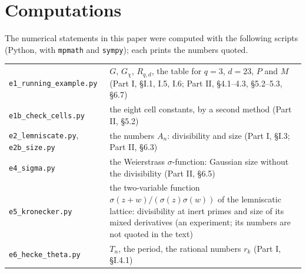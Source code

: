 \documentclass[11pt,letterpaper]{article}
\begin{document}
{\setlength{\parindent}{0pt}


\section*{Computations}

The numerical statements in this paper were computed with the following scripts (Python, with
\texttt{mpmath} and \texttt{sympy}); each prints the numbers quoted.

\begin{center}\small
\begin{tabular}{p{}p{}}
\texttt{e1\_running\_example.py} & $G$, $G_\chi$, $R_{q,d}$, the table for $q=3$, $d=23$, $P$ and $M$ (Part I, \S I.1, I.5, I.6; Part II, \S4.1--4.3, \S5.2--5.3, \S6.7)\\
\texttt{e1b\_check\_cells.py} & the eight cell constants, by a second method (Part II, \S5.2)\\
\texttt{e2\_lemniscate.py}, \texttt{e2b\_size.py} & the numbers $A_n$: divisibility and size (Part I, \S I.3; Part II, \S6.3)\\
\texttt{e4\_sigma.py} & the Weierstrass $\sigma$-function: Gaussian size without the divisibility (Part II, \S6.5)\\
\texttt{e5\_kronecker.py} & the two-variable function $\sigma(z+w)/(\sigma(z)\sigma(w))$ of the lemniscatic lattice: divisibility at inert primes and size of its mixed derivatives (an experiment; its numbers are not quoted in the text)\\
\texttt{e6\_hecke\_theta.py} & $T_n$, the period, the rational numbers $r_k$ (Part I, \S I.4.1)\\
\end{tabular}
\end{center}
}
\end{document}
